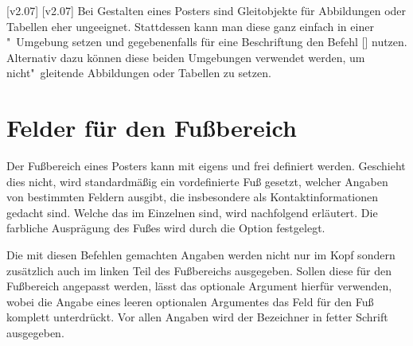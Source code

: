 \begin{DeclareEntity}{}
\begin{Declaration}
\begin{Declaration}
[v2.07]
[v2.07]
Bei Gestalten eines Posters sind Gleitobjekte für Abbildungen oder Tabellen 
eher ungeeignet. Stattdessen kann man diese ganz einfach in einer 
"~Umgebung setzen und gegebenenfalls für eine 
Beschriftung den Befehl
[] 
nutzen. Alternativ dazu können diese beiden Umgebungen verwendet werden, um 
nicht"~gleitende Abbildungen oder Tabellen zu setzen.
\end{Declaration}
\end{Declaration}



\section{%
  Felder für den Fußbereich%
  \label{sec:poster:foot}%
}

Der Fußbereich eines Posters kann mit  eigens und frei 
definiert werden. Geschieht dies nicht, wird standardmäßig ein vordefinierte 
Fuß gesetzt, welcher Angaben von bestimmten Feldern ausgibt, die insbesondere 
als Kontaktinformationen gedacht sind. Welche das im Einzelnen sind, wird 
nachfolgend erläutert. Die farbliche Ausprägung des Fußes wird durch die Option
 festgelegt.

\begin{Declaration}
  {}
\begin{Declaration}
  {}
\begin{Declaration}
  {}
\begin{Declaration}
  {}
\printdeclarationlist

Die mit diesen Befehlen gemachten Angaben werden nicht nur im Kopf sondern 
zusätzlich auch im linken Teil des Fußbereichs ausgegeben. Sollen diese für den 
Fußbereich angepasst werden, lässt das optionale Argument hierfür verwenden, 
wobei die Angabe eines leeren optionalen Argumentes das Feld für den Fuß 
komplett unterdrückt. Vor allen Angaben wird der Bezeichner  
in fetter Schrift ausgegeben.
\end{Declaration}
\end{Declaration}
\end{Declaration}
\end{Declaration}



\end{DeclareEntity}
